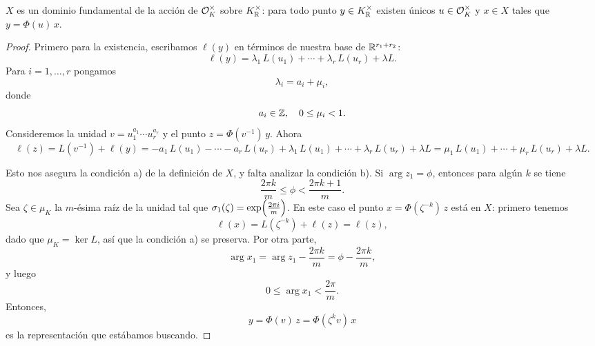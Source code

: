 \begin{proposicion}
  $X$ es un dominio fundamental de la acción de $\mathcal{O}_K^\times$ sobre
  $K_{\mathbb{R}}^\times$: para todo punto $y \in K_{\mathbb{R}}^\times$ existen únicos
  $u \in \mathcal{O}_K^\times$ y $x \in X$ tales que $y = \Phi (u)\,x$.

  \begin{proof}
    Primero para la existencia, escribamos $\ell (y)$ en términos de nuestra
    base de $\mathbb{R}^{r_1+r_2}$:
    $$\ell (y) = \lambda_1 \, L (u_1) + \cdots + \lambda_r \, L (u_r) + \lambda L.$$
    Para $i = 1,\ldots,r$ pongamos
    $$\lambda_i = a_i + \mu_i,$$
    donde
    $$a_i \in \mathbb{Z}, \quad 0 \le \mu_i < 1.$$
    Consideremos la unidad $v = u_1^{a_1}\cdots u_r^{a_r}$ y el punto
    $z = \Phi (v^{-1})\,y$. Ahora
    \[ \ell (z) = L (v^{-1}) + \ell (y) =
       - a_1\,L (u_1) - \cdots - a_r\,L(u_r)
       + \lambda_1 \, L (u_1) + \cdots + \lambda_r \, L (u_r) + \lambda L =
       \mu_1 \, L (u_1) + \cdots + \mu_r \, L (u_r) + \lambda L. \]

    Esto nos asegura la condición a) de la definición de $X$, y falta analizar
    la condición b). Si $\arg z_1 = \phi$, entonces para algún $k$ se tiene
    $$\frac{2\pi k}{m} \le \phi < \frac{2\pi {k+1}}{m}.$$
    Sea $\zeta \in \mu_K$ la $m$-ésima raíz de la unidad tal que
    $\sigma_1 (\zeta) = \exp \Bigl(\frac{2\pi i}{m}\Bigr)$. En este caso
    el punto $x = \Phi (\zeta^{-k})\,z$ está en $X$: primero tenemos
    $$\ell (x) = L (\zeta^{-k}) + \ell (z) = \ell (z),$$
    dado que $\mu_K = \ker L$, así que la condición a) se preserva. Por otra
    parte,
    $$\arg x_1 = \arg z_1 - \frac{2\pi k}{m} = \phi - \frac{2\pi k}{m},$$
    y luego
    $$0 \le \arg x_1 < \frac{2\pi}{m}.$$
    Entonces,
    $$y = \Phi (v)\,z = \Phi (\zeta^k v)\,x$$
    es la representación que estábamos buscando.


\end{proof}
\end{proposicion}
